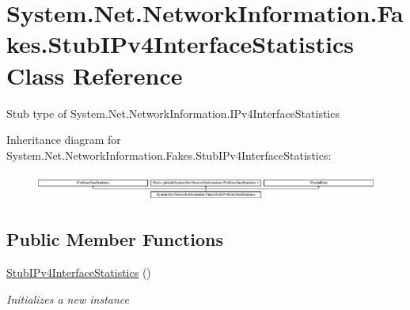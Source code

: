 \hypertarget{class_system_1_1_net_1_1_network_information_1_1_fakes_1_1_stub_i_pv4_interface_statistics}{\section{System.\-Net.\-Network\-Information.\-Fakes.\-Stub\-I\-Pv4\-Interface\-Statistics Class Reference}
\label{class_system_1_1_net_1_1_network_information_1_1_fakes_1_1_stub_i_pv4_interface_statistics}
}


Stub type of System.\-Net.\-Network\-Information.\-I\-Pv4\-Interface\-Statistics 


Inheritance diagram for System.\-Net.\-Network\-Information.\-Fakes.\-Stub\-I\-Pv4\-Interface\-Statistics\-:\begin{figure}[H]
\begin{center}
\leavevmode
\includegraphics[height=0.903955cm]{class_system_1_1_net_1_1_network_information_1_1_fakes_1_1_stub_i_pv4_interface_statistics}
\end{center}
\end{figure}
\subsection*{Public Member Functions}
\begin{DoxyCompactItemize}
\item 
\hyperlink{class_system_1_1_net_1_1_network_information_1_1_fakes_1_1_stub_i_pv4_interface_statistics_a78bb3b9a159f80dfafc180300b814025}{Stub\-I\-Pv4\-Interface\-Statistics} ()
\begin{DoxyCompactList}\small\item\em Initializes a new instance\end{DoxyCompactList}\end{DoxyCompactItemize}
